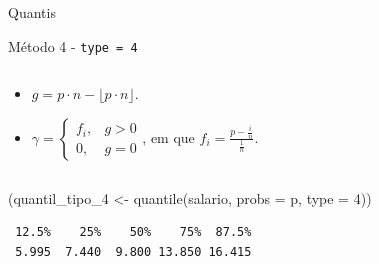 \documentclass[
  10pt,
  ignorenonframetext,
]{beamer}
\newenvironment{Shaded}{\begin{snugshade}}{\end{snugshade}}
\newcommand{\AttributeTok}[1]{\textcolor[rgb]{0.40,0.45,0.13}{#1}}
\newcommand{\DecValTok}[1]{\textcolor[rgb]{0.68,0.00,0.00}{#1}}
\newcommand{\FunctionTok}[1]{\textcolor[rgb]{0.28,0.35,0.67}{#1}}
\newcommand{\NormalTok}[1]{\textcolor[rgb]{0.00,0.23,0.31}{#1}}
\newcommand{\OtherTok}[1]{\textcolor[rgb]{0.00,0.23,0.31}{#1}}
\providecommand{\tightlist}{%
  \setlength{\itemsep}{0pt}\setlength{\parskip}{0pt}}\usepackage{longtable,booktabs,array}
\begin{document}
\begin{frame}[fragile]{Quantis}
\begin{block}{Método 4 - \texttt{type\ =\ 4}}
\begin{columns}[T]
\begin{column}{0.7\textwidth}
\begin{itemize}
\tightlist
\item
  \(g = p\cdot n - \lfloor p\cdot n \rfloor\).
\item
  \(\gamma = \begin{cases} f_i,& g> 0\\ 0,& g = 0 \end{cases}\), em que
  \(f_i = \frac{p - \frac{i}{n}}{\frac{1}{n}}\).
\end{itemize}
\end{column}
\end{columns}

\begin{Shaded}
\begin{Highlighting}[]
\NormalTok{(quantil\_tipo\_4 }\OtherTok{\textless{}{-}} \FunctionTok{quantile}\NormalTok{(salario, }\AttributeTok{probs =}\NormalTok{ p, }\AttributeTok{type =} \DecValTok{4}\NormalTok{))}
\end{Highlighting}
\end{Shaded}

\begin{verbatim}
 12.5%    25%    50%    75%  87.5% 
 5.995  7.440  9.800 13.850 16.415 
\end{verbatim}
\end{block}
\end{frame}
\end{document}
